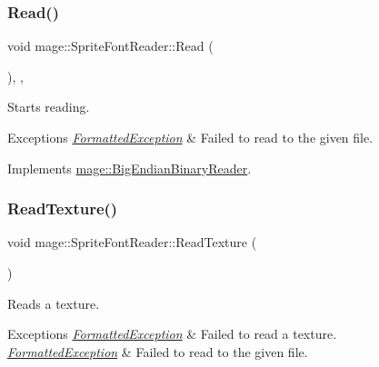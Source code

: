 \subsubsection{\texorpdfstring{Read()}{Read()}}
{\footnotesize\ttfamily void mage\+::\+Sprite\+Font\+Reader\+::\+Read (\begin{DoxyParamCaption}{ }\end{DoxyParamCaption})\hspace{0.3cm}{\ttfamily [override]}, {\ttfamily [private]}, {\ttfamily [virtual]}}

Starts reading.


\begin{DoxyExceptions}{Exceptions}
{\em \hyperlink{structmage_1_1_formatted_exception}{Formatted\+Exception}} & Failed to read to the given file. \\
\hline
\end{DoxyExceptions}


Implements \hyperlink{classmage_1_1_big_endian_binary_reader_af072965dea0319d6366b21cc6562bbf9}{mage\+::\+Big\+Endian\+Binary\+Reader}.

\hypertarget{classmage_1_1_sprite_font_reader_a12877a168b5dc2a95ec307a37d20ddca}{}\label{classmage_1_1_sprite_font_reader_a12877a168b5dc2a95ec307a37d20ddca} 
\subsubsection{\texorpdfstring{Read\+Texture()}{ReadTexture()}}
{\footnotesize\ttfamily void mage\+::\+Sprite\+Font\+Reader\+::\+Read\+Texture (\begin{DoxyParamCaption}{ }\end{DoxyParamCaption})\hspace{0.3cm}{\ttfamily [private]}}

Reads a texture.


\begin{DoxyExceptions}{Exceptions}
{\em \hyperlink{structmage_1_1_formatted_exception}{Formatted\+Exception}} & Failed to read a texture. \\
\hline
{\em \hyperlink{structmage_1_1_formatted_exception}{Formatted\+Exception}} & Failed to read to the given file. \\
\hline
\end{DoxyExceptions}


